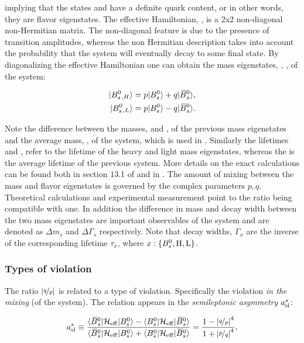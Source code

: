 \noindent implying that the states \Bs and \Bsb have a definite quark content, or in other words,
they are flavor eigenstates. The effective Hamiltonian, \Heff, is a 2x2 non-diagonal non-Hermitian matrix.
The non-diagonal feature is due to the presence of \BBbarSyst transition amplitudes,
whereas the non Hermitian description takes into account the probability that the system will
eventually decay to some final state. By diagonalizing the effective Hamiltonian one can obtain
the mass eigenstates, , , of the system:

\begin{align}
  \centering
  \ket{\BsH} &= p \ket{\Bs} + q \ket{\Bsb}, \nonumber \\
  \ket{\BsL} &= p \ket{\Bs} - q \ket{\Bsb}.
  \label{bs_mass_eigen}
\end{align}

\noindent Note the difference between the masses, \mass{\BsH} and \mass{\BsL}, of the previous mass
eigenstates and the average mass, \mass{\Bs}, of the \BBbarSyst system, which is used in .
Similarly the lifetimes \tauH and \tauL, refer to the lifetime of the heavy and light mass eigenstates, whereas
the \tauBs is the average lifetime of the previous system. More details on the exact calculations can be found both in section 13.1
of \cite{PDG} and in \cite{jeroenThesis,DeBruyn-thesis}. The amount of mixing between the mass
and flavor eigenstates is governed by the complex parameters $p,q$.
Theoretical calculations \cite{Lenz:2011ti} and experimental measurement \cite{asl-paper} point to the ratio
\qoverp being compatible with one. In addition the difference in mass and decay width between the two mass
eigenstates are important observables of the \BBbarSyst system and are denoted as $\Delta m_s$ and $\Delta\Gamma_s$
respectively. Note that decay widths, $\Gamma_x$ are the inverse of the corresponding lifetime $\tau_x$, where $x:\{B^0_s,{\rm H},{\rm L}\}$.

\subsubsection{Types of \CP violation}
The ratio $|\nicefrac{q}{p}|$ is related to a type of \CP violation. Specifically the \CP violation {\it in the mixing} (of the \BBbarSyst system).
The relation appears in the  {\it semileptonic asymmetry} $a_{\rm sl}^{s}$:

\begin{equation}
  \centering
  a_{\rm sl}^{s}  \equiv \frac{\bra{\Bsb}\Heff\ket{\Bs} - \bra{\Bs}\Heff\ket{\Bsb}} {\bra{\Bsb}\Heff\ket{\Bs} + \bra{\Bs}\Heff\ket{\Bsb}}
                       = \frac{1 - \left|\nicefrac{q}{p}\right|^4}{1 + \left|\nicefrac{p}{q}\right|^4},
  \label{acp_mixing}
\end{equation}

